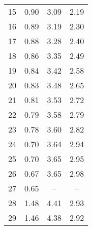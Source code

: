 \begin{longtable}[c]{cccc}
	15                        & 0.90                           & 3.09                                      & 2.19                         \\
	16                        & 0.89                           & 3.19                                      & 2.30                         \\
	17                        & 0.88                           & 3.28                                      & 2.40                         \\
	18                        & 0.86                           & 3.35                                      & 2.49                         \\
	19                        & 0.84                           & 3.42                                      & 2.58                         \\
	20                        & 0.83                           & 3.48                                      & 2.65                         \\
	21                        & 0.81                           & 3.53                                      & 2.72                         \\
	22                        & 0.79                           & 3.58                                      & 2.79                         \\
	23                        & 0.78                           & 3.60                                      & 2.82                         \\
	24                        & 0.70                           & 3.64                                      & 2.94                         \\
	25                        & 0.70                           & 3.65                                      & 2.95                         \\
	26                        & 0.67                           & 3.65                                      & 2.98                         \\
	27                        & 0.65                           & --                                        & --                           \\
	28                        & 1.48                           & 4.41                                      & 2.93                         \\
	29                        & 1.46                           & 4.38                                      & 2.92                         \\

\end{longtable}
